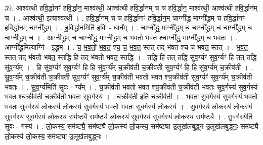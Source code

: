 \documentclass[17pt]{extarticle}
\begin{document}
39. आश्व॑त्थी हवि॒र्द्धानꣳ॑ हवि॒र्द्धान॒ माश्व॑त्थी॒ आश्व॑त्थी हवि॒र्द्धान॑म् च च हवि॒र्द्धान॒ माश्व॑त्थी॒ आश्व॑त्थी हवि॒र्द्धान॑म् च । . आश्व॑त्थी॒ इत्याश्व॑त्थी । . ह॒वि॒र्द्धान॑म् च च हवि॒र्द्धानꣳ॑ हवि॒र्द्धान॒म् चाग्नी᳚द्ध्र॒ माग्नी᳚द्ध्रम् च हवि॒र्द्धानꣳ॑ हवि॒र्द्धान॒म् चाग्नी᳚द्ध्रम् । . ह॒वि॒र्द्धान॒मिति॑ हविः - धान᳚म् । . चाग्नी᳚द्ध्र॒ माग्नी᳚द्ध्रम् च॒ चाग्नी᳚द्ध्रम् च॒ चाग्नी᳚द्ध्रम् च॒ चाग्नी᳚द्ध्रम् च । . आग्नी᳚द्ध्रम् च॒ चाग्नी᳚द्ध्र॒ माग्नी᳚द्ध्रम् च भवतो भवत॒ श्चाग्नी᳚द्ध्र॒ माग्नी᳚द्ध्रम् च भवतः । . आग्नी᳚द्ध्र॒मित्याग्नि॑ - इ॒द्ध्र॒म् । . च॒ भ॒व॒तो॒ भ॒व॒त॒ श्च॒ च॒ भ॒व॒त॒ स्तत् तद् भ॑वत श्च च भवत॒ स्तत् । . भ॒व॒त॒ स्तत् तद् भ॑वतो भवत॒ स्तद्धि हि तद् भ॑वतो भवत॒ स्तद्धि । . तद्धि हि तत् तद्धि सु॑व॒र्ग्यꣳ॑ सुव॒र्ग्यꣳ॑ हि तत् तद्धि सु॑व॒र्ग्य᳚म् । . हि सु॑व॒र्ग्यꣳ॑ सुव॒र्ग्यꣳ॑ हि हि सु॑व॒र्ग्य॑म् च॒क्रीव॑ती च॒क्रीव॑ती सुव॒र्ग्यꣳ॑ हि हि सु॑व॒र्ग्य॑म् च॒क्रीव॑ती । . सु॒व॒र्ग्य॑म् च॒क्रीव॑ती च॒क्रीव॑ती सुव॒र्ग्यꣳ॑ सुव॒र्ग्य॑म् च॒क्रीव॑ती भवतो भवत श्च॒क्रीव॑ती सुव॒र्ग्यꣳ॑ सुव॒र्ग्य॑म् च॒क्रीव॑ती भवतः । . सु॒व॒र्ग्य॑मिति॑ सुवः - ग्य᳚म् । . च॒क्रीव॑ती भवतो भवत श्च॒क्रीव॑ती च॒क्रीव॑ती भवतः सुव॒र्गस्य॑ सुव॒र्गस्य॑ भवत श्च॒क्रीव॑ती च॒क्रीव॑ती भवतः सुव॒र्गस्य॑ । . च॒क्रीव॑ती॒ इति॑ च॒क्रीव॑ती । . भ॒व॒तः॒ सु॒व॒र्गस्य॑ सुव॒र्गस्य॑ भवतो भवतः सुव॒र्गस्य॑ लो॒कस्य॑ लो॒कस्य॑ सुव॒र्गस्य॑ भवतो भवतः सुव॒र्गस्य॑ लो॒कस्य॑ । . सु॒व॒र्गस्य॑ लो॒कस्य॑ लो॒कस्य॑ सुव॒र्गस्य॑ सुव॒र्गस्य॑ लो॒कस्य॒ सम॑ष्ट्यै॒ सम॑ष्ट्यै लो॒कस्य॑ सुव॒र्गस्य॑ सुव॒र्गस्य॑ लो॒कस्य॒ सम॑ष्ट्यै । . सु॒व॒र्गस्येति॑ सुवः - गस्य॑ । . लो॒कस्य॒ सम॑ष्ट्यै॒ सम॑ष्ट्यै लो॒कस्य॑ लो॒कस्य॒ सम॑ष्ट्या उ॒लूख॑लबुद्ध्न उ॒लूख॑लबुद्ध्नः॒ सम॑ष्ट्यै लो॒कस्य॑ लो॒कस्य॒ सम॑ष्ट्या उ॒लूख॑लबुद्ध्नः । \newline
\end{document}
